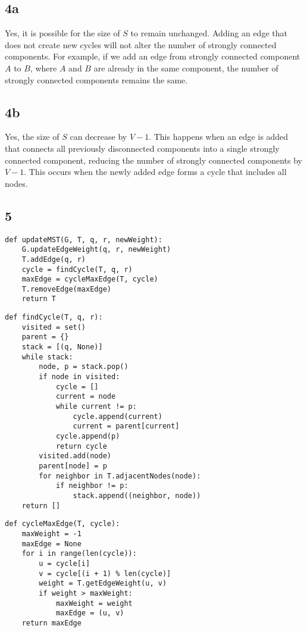 \documentclass{article}
\begin{document}
\subsection*{4a}
Yes, it is possible for the size of \( S \) to remain unchanged. Adding an edge that does not create new cycles will not alter the number of strongly connected components. For example, if we add an edge from strongly connected component \( A \) to \( B \), where \( A \) and \( B \) are already in the same component, the number of strongly connected components remains the same.

\subsection*{4b}
Yes, the size of \( S \) can decrease by \(V - 1\). This happens when an edge is added that connects all previously disconnected components into a single strongly connected component, reducing the number of strongly connected components by \(V - 1\). This occurs when the newly added edge forms a cycle that includes all nodes.

\pagebreak

\subsection*{5}

\begin{verbatim}
def updateMST(G, T, q, r, newWeight):
    G.updateEdgeWeight(q, r, newWeight)
    T.addEdge(q, r)
    cycle = findCycle(T, q, r)
    maxEdge = cycleMaxEdge(T, cycle)
    T.removeEdge(maxEdge)
    return T
\end{verbatim}

\begin{verbatim}
def findCycle(T, q, r):
    visited = set()
    parent = {}
    stack = [(q, None)]
    while stack:
        node, p = stack.pop()
        if node in visited:
            cycle = []
            current = node
            while current != p:
                cycle.append(current)
                current = parent[current]
            cycle.append(p)
            return cycle
        visited.add(node)
        parent[node] = p
        for neighbor in T.adjacentNodes(node):
            if neighbor != p:
                stack.append((neighbor, node))
    return []
\end{verbatim}

\begin{verbatim}
def cycleMaxEdge(T, cycle):
    maxWeight = -1
    maxEdge = None
    for i in range(len(cycle)):
        u = cycle[i]
        v = cycle[(i + 1) % len(cycle)]
        weight = T.getEdgeWeight(u, v)
        if weight > maxWeight:
            maxWeight = weight
            maxEdge = (u, v)
    return maxEdge
\end{verbatim}
\end{document}
